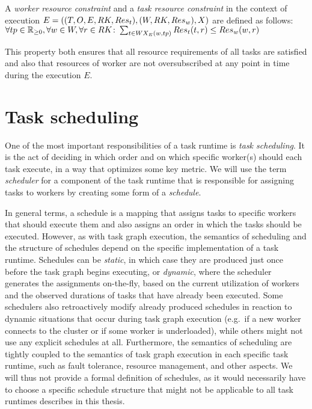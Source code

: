 \vspace{2mm} A
\emph{worker resource constraint} and a \emph{task resource constraint} in the context of execution
$E = ((T, O, E, RK, Res_t), (W, RK, Res_w), X)$
are defined as follows: \vspace{1mm}\\
$\forall tp\in\mathbb{R}_{\geq{}0}, \forall w\in{}W, \forall
r\in{}RK\colon \sum_{t\in{}WX_E(w, tp)} Res_t(t, r) \leq
Res_w(w, r)$

\vspace{1mm}This property both ensures that all resource requirements of all tasks are
satisfied and also that resources of worker are not oversubscribed at any point in time during the
execution $E$.

\section{Task scheduling}
\label{sec:task-scheduling}
One of the most important responsibilities of a task runtime is \emph{task scheduling}. It is the
act of deciding in which order and on which specific worker(s) should each task execute, in a way
that optimizes some key metric. We will use the term \emph{scheduler} for a component of the
task runtime that is responsible for assigning tasks to workers by creating some form of a
\emph{schedule}.

In general terms, a schedule is a mapping that assigns tasks to specific workers that should
execute them and also assigns an order in which the tasks should be executed. However, as with task
graph execution, the semantics of scheduling and the structure of schedules depend on the specific
implementation of a task runtime. Schedules can be \emph{static}, in which case they are
produced just once before the task graph begins executing, or \emph{dynamic}, where the
scheduler generates the assignments on-the-fly, based on the current utilization of workers and the
observed durations of tasks that have already been executed. Some schedulers also retroactively
modify already produced schedules in reaction to dynamic situations that occur during task graph
execution (e.g.\ if a new worker connects to the cluster or if some worker is underloaded), while
others might not use any explicit schedules at all. Furthermore, the semantics of scheduling are
tightly coupled to the semantics of task graph execution in each specific task runtime, such as
fault tolerance, resource management, and other aspects. We will thus not provide a formal
definition of schedules, as it would necessarily have to choose a specific schedule structure that
might not be applicable to all task runtimes describes in this thesis.

